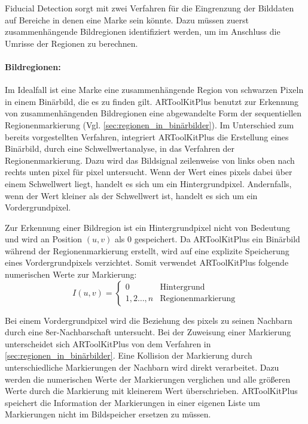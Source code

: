 Fiducial Detection sorgt mit zwei Verfahren für die Eingrenzung der Bilddaten auf Bereiche in denen eine Marke sein
 könnte. Dazu müssen zuerst zusammenhängende Bildregionen identifiziert werden, um im Anschluss die Umrisse der
 Regionen zu berechnen.

\paragraph{Bildregionen:} %
\label{par:bildregionen}
Im Idealfall ist eine Marke eine zusammenhängende Region von schwarzen Pixeln in einem Binärbild, die es zu finden
 gilt. ARToolKitPlus benutzt zur Erkennung von zusammenhängenden Bildregionen eine abgewandelte Form der sequentiellen
 Regionenmarkierung (Vgl. \autoref{sec:regionen_in_binärbilder}). Im Unterschied zum bereits vorgestellten Verfahren,
 integriert ARToolKitPlus die Erstellung eines Binärbild, durch eine Schwellwertanalyse, in das Verfahren der
 Regionenmarkierung. Dazu wird das Bildsignal zeilenweise von links oben nach rechts unten \gls{pixel} für \gls{pixel}
 untersucht. Wenn der Wert eines \glspl{pixel} dabei über einem Schwellwert liegt, handelt es sich um ein
 Hintergrundpixel. Andernfalls, wenn der Wert kleiner als der Schwellwert ist, handelt es sich um ein
 Vordergrundpixel.

Zur Erkennung einer Bildregion ist ein Hintergrundpixel nicht von Bedeutung und wird an Position $(u,v)$ als $0$
 gespeichert. Da ARToolKitPlus ein Binärbild während der Regionenmarkierung erstellt, wird auf eine explizite
 Speicherung eines Vordergrundpixels verzichtet. Somit verwendet ARToolKitPlus folgende numerischen Werte zur
 Markierung:
\begin{equation*}
	I(u,v) = \begin{cases}
	0 & \textrm{Hintergrund}\\
	1,2\ldots,n & \textrm{Regionenmarkierung}
	\end{cases}
\end{equation*}

Bei einem Vordergrundpixel wird die Beziehung des \glspl{pixel} zu seinen Nachbarn durch eine 8er-Nachbarschaft
 untersucht. Bei der Zuweisung einer Markierung unterscheidet sich ARToolKitPlus von dem Verfahren in
 \autoref{sec:regionen_in_binärbilder}. Eine Kollision der Markierung durch unterschiedliche Markierungen der Nachbarn
 wird direkt verarbeitet. Dazu werden die numerischen Werte der Markierungen verglichen und alle größeren Werte durch
 die Markierung mit kleinerem Wert überschrieben. ARToolKitPlus speichert die Information der Markierungen in einer
 eigenen Liste um Markierungen nicht im Bildspeicher ersetzen zu müssen.

